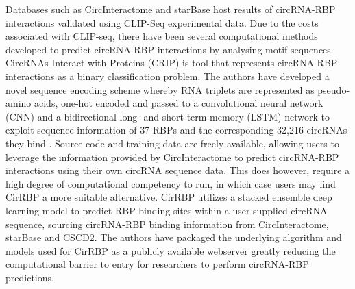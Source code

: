 \documentclass[pdflatex,sn-mathphys-num]{sn-jnl}
\begin{document}
Databases such as CircInteractome \cite{circinteractome} and starBase \cite{starbase} host results of circRNA-RBP interactions validated using CLIP-Seq experimental data. Due to the costs associated with CLIP-seq, there have been several computational methods developed to predict circRNA-RBP interactions by analysing motif sequences. CircRNAs Interact with Proteins (CRIP) is tool that represents circRNA-RBP interactions as a binary classification problem. The authors have developed a novel sequence encoding scheme whereby RNA triplets are represented as pseudo-amino acids, one-hot encoded and passed to a convolutional neural network (CNN) and a bidirectional long- and short-term memory (LSTM) network to exploit sequence information of 37 RBPs and the corresponding 32,216 circRNAs they bind \cite{CRIP}. Source code and training data are freely available, allowing users to leverage the information provided by CircInteractome to predict circRNA-RBP interactions using their own circRNA sequence data. This does however, require a high degree of computational competency to run, in which case users may find CirRBP \cite{CirRBP} a more suitable alternative. CirRBP utilizes a stacked ensemble deep learning model to predict RBP binding sites within a user supplied circRNA sequence, sourcing circRNA-RBP binding information from CircInteractome, starBase and CSCD2. The authors have packaged the underlying algorithm and models used for CirRBP as a publicly available webserver \cite{cirRBP-website} greatly reducing the computational barrier to entry for researchers to perform circRNA-RBP predictions. 
\end{document}
